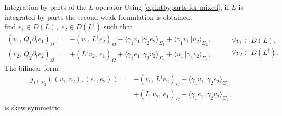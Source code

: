 \documentclass[aspectratio=169]{beamer}
\newcommand{\inner}[3][]{\ensuremath{( #2, \, #3 )_{#1}}}
\newcommand{\dualpr}[3][]{\ensuremath{\langle #2 \, \vert #3 \rangle_{#1}}}
\begin{document}
\begin{frame}{Integration by parts of the $L$ operator}
	Using \eqref{eq:intbyparts-for-mixed}, if $L$ is integrated by parts the second weak formulation is obtained: \\
	find $e_1 \in D(L), \; e_2 \in D(L^\dag)$ such that
	\begin{equation*}
	\begin{aligned}
		\inner[\Omega]{v_1}{Q_1 \partial_t e_1} = &-\inner[\Omega]{v_1}{L^\dag e_2} - \dualpr[\Sigma_2]{\gamma_1 v_1}{\gamma_2 e_2} + \dualpr[\Sigma_2]{\gamma_1 v_1}{u_2}, \\
		\inner[\Omega]{v_2}{Q_2 \partial_t e_2} = &+\inner[\Omega]{L^\dag v_2}{e_1} + \dualpr[\Sigma_2]{\gamma_1 e_1}{\gamma_2 v_2} + \dualpr[\Sigma_1]{u_1}{\gamma_2 v_2},
	\end{aligned} \qquad
	\begin{aligned}
	\forall v_1 \in D(L), \\
	\forall v_2 \in D(L^\dag).
	\end{aligned}
	\end{equation*}
	The bilinear form 
	\begin{equation*}
		\begin{aligned}
			j_{L^\dag,\Sigma_2}((v_1, v_2), (e_1, e_2)) = &-\inner[\Omega]{v_1}{L^\dag e_2} - \dualpr[\Sigma_2]{\gamma_1 v_1}{\gamma_2 e_2}  \\
			&+\inner[\Omega]{L^\dag v_2}{e_1} + \dualpr[\Sigma_2]{\gamma_1 e_1}{\gamma_2 v_2},
		\end{aligned}
	\end{equation*}
	is skew symmetric. 
\end{frame}
\end{document}
